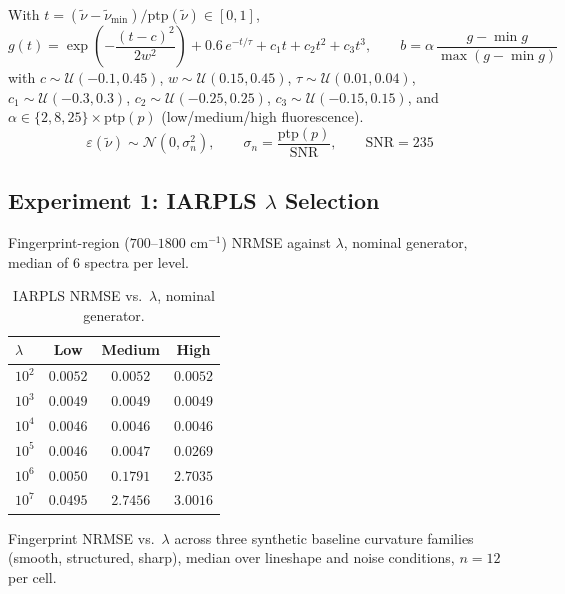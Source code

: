 With $t=(\tilde\nu-\tilde\nu_{\min})/\mathrm{ptp}(\tilde\nu)\in[0,1]$,
\[
g(t) = \exp\!\left(-\frac{(t-c)^2}{2w^2}\right) + 0.6\,e^{-t/\tau} + c_1t+c_2t^2+c_3t^3, \qquad b = \alpha\,\frac{g-\min g}{\max(g-\min g)}
\]
with $c\sim\mathcal U(-0.1,0.45)$, $w\sim\mathcal U(0.15,0.45)$, $\tau\sim\mathcal U(0.01,0.04)$, $c_1\sim\mathcal U(-0.3,0.3)$, $c_2\sim\mathcal U(-0.25,0.25)$, $c_3\sim\mathcal U(-0.15,0.15)$, and $\alpha \in \{2,8,25\}\times\mathrm{ptp}(p)$ (low/medium/high fluorescence).
\[
\varepsilon(\tilde\nu)\sim\mathcal N(0,\sigma_n^2), \qquad \sigma_n=\frac{\mathrm{ptp}(p)}{\mathrm{SNR}}, \qquad \mathrm{SNR}=235
\]

\subsection*{Experiment 1: IARPLS $\lambda$ Selection}
Fingerprint-region ($700$--$1800\text{ cm}^{-1}$) NRMSE against $\lambda$, nominal generator, median of 6 spectra per level.

\begin{table}[H]
\centering
\small
\caption{IARPLS NRMSE vs.\ $\lambda$, nominal generator.}
\label{tab:baseline_lambda_fit}
\begin{tabular*}{\textwidth}{@{\extracolsep{\fill}}lccc}
\toprule
$\lambda$ & Low & Medium & High \\
\midrule
$10^2$ & $0.0052$ & $0.0052$ & $0.0052$ \\
$10^3$ & $0.0049$ & $0.0049$ & $0.0049$ \\
$10^4$ & $0.0046$ & $0.0046$ & $0.0046$ \\
$10^5$ & $0.0046$ & $0.0047$ & $0.0269$ \\
$10^6$ & $0.0050$ & $0.1791$ & $2.7035$ \\
$10^7$ & $0.0495$ & $2.7456$ & $3.0016$ \\
\bottomrule
\end{tabular*}
\end{table}

Fingerprint NRMSE vs.\ $\lambda$ across three synthetic baseline curvature families (smooth, structured, sharp), median over lineshape and noise conditions, $n=12$ per cell.

